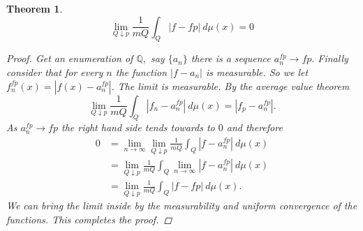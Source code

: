 \documentclass[letter]{article}
\newtheorem{theorem}{Theorem}
\newenvironment{menumerate}{%
  \edef\backupindent{\the\parindent}%
  \enumerate%
  \setlength{\parindent}{\backupindent}%
}{\endenumerate}
\begin{document}
\begin{menumerate}
\begin{theorem}
		\begin{equation}
			\lim_{Q\downarrow p} \frac{1}{mQ} \int_Q |f- fp|\ d\mu(x) = 0
		\end{equation}
		\begin{proof}
			Get an enumeration of $\mathbb{Q},$ say $\{a_n\}$ there is a sequence $a^{fp}_n \to fp.$ Finally
			consider that for every $n$ the function $|f -a_n|$ is measurable. So we let $f_n^{fp}(x) = |f(x) - a^{fp}_n|.$
			The limit is measurable. By the average value theorem
			\begin{equation}
				\lim_{Q\downarrow p} \frac{1}{mQ} \int_Q |f_n-  a^{fp}_n|\ d\mu(x) = |f_p - a^{fp}_n|.
			\end{equation}
			As $ a^{fp}_n\to fp$ the right hand side  tends towards to $0$ and therefore
			 \begin{equation}
			 	\begin{aligned}
					0 &= \lim_{ n\to \infty}\lim_{Q\downarrow p} \frac{1}{mQ} \int_Q |f- a^{fp}_n|\ d\mu(x)  \\
					&=  \lim_{Q\downarrow p}  \frac{1}{mQ} \int_Q \lim_{ n\to \infty} |f- a^{fp}_n|\ d\mu(x)  \\
					&= \lim_{Q\downarrow p} \frac{1}{mQ} \int_Q |f- fp|\ d\mu(x) .
			 	\end{aligned}
			 \end{equation}
			 We can bring the limit inside by the measurability and uniform convergence of the functions.
			 This completes the proof.

		\end{proof}
	\end{theorem}
\end{menumerate}
\end{document}
